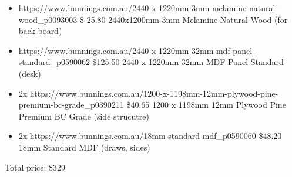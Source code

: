 \documentclass[12pt]{article}
\begin{document}
\begin{itemize}
	\item https://www.bunnings.com.au/2440-x-1220mm-3mm-melamine-natural-wood\_p0093003 \$ 25.80 2440x1200mm 3mm Melamine Natural Wood  (for back board)
	\item https://www.bunnings.com.au/2440-x-1220mm-32mm-mdf-panel-standard\_p0590062 \$125.50 2440 x 1220mm 32mm MDF Panel Standard (desk)
	\item 2x https://www.bunnings.com.au/1200-x-1198mm-12mm-plywood-pine-premium-bc-grade\_p0390211 \$40.65 1200 x 1198mm 12mm Plywood Pine Premium BC Grade (side strucutre)
        \item 2x https://www.bunnings.com.au/18mm-standard-mdf\_p0590060 \$48.20 18mm Standard MDF (draws, sides)
\end{itemize}
Total price: \$329\\





\end{document}
